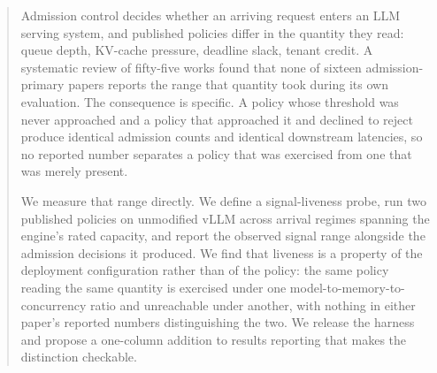 \begin{abstract}
Admission control decides whether an arriving request enters an LLM serving
system, and published policies differ in the quantity they read: queue depth,
KV-cache pressure, deadline slack, tenant credit. A systematic review of
fifty-five works found that none of sixteen admission-primary papers reports the
range that quantity took during its own evaluation. The consequence is specific.
A policy whose threshold was never approached and a policy that approached it
and declined to reject produce identical admission counts and identical
downstream latencies, so no reported number separates a policy that was
exercised from one that was merely present.

We measure that range directly. We define a signal-liveness probe, run two
published policies on unmodified vLLM across arrival regimes spanning the
engine's rated capacity, and report the observed signal range alongside the
admission decisions it produced. We find that liveness is a property of the
deployment configuration rather than of the policy: the same policy reading the
same quantity is exercised under one model-to-memory-to-concurrency ratio and
unreachable under another, with nothing in either paper's reported numbers
distinguishing the two. We release the harness and propose a one-column addition
to results reporting that makes the distinction checkable.
\end{abstract}

